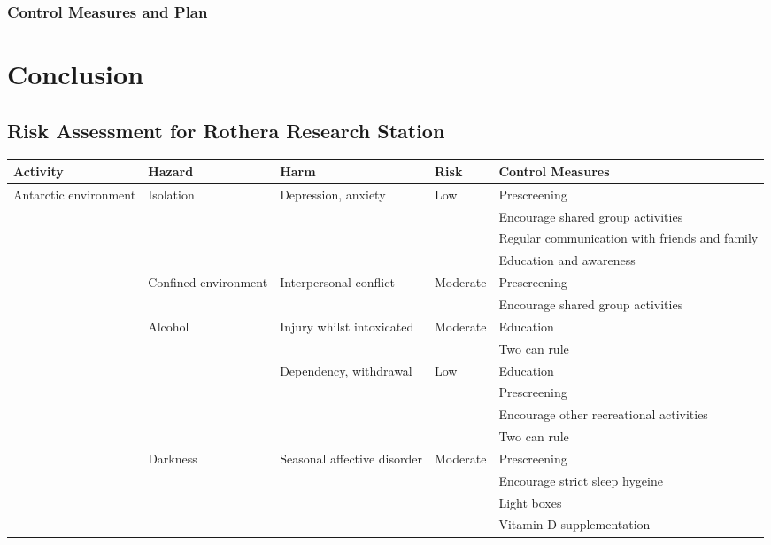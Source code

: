 \documentclass[12pt,a4paper]{article}
\begin{document}
\subsubsection{Control Measures and Plan}

\section{Conclusion}

\appendix
\begin{landscape}
    \section{Risk Assessment for Rothera Research Station}
    \begin{longtabu} to\linewidth{X[l]X[l]X[l]X[l]X[2,l]}
        \toprule
        \rowfont\bfseries Activity & Hazard & Harm & Risk & Control Measures \\
        \midrule
        \endhead
        Antarctic environment & Isolation & Depression, anxiety & Low & Prescreening \\
         &  &  &  & Encourage shared group activities \\
         &  &  &  & Regular communication with friends and family \\
         &  &  &  & Education and awareness \\
         & Confined environment & Interpersonal conflict & Moderate & Prescreening \\
         &  &  &  & Encourage shared group activities \\
         & Alcohol & Injury whilst intoxicated & Moderate & Education \\
         &  &  &  & Two can rule \\
         &  & Dependency, withdrawal & Low & Education \\
         &  &  &  & Prescreening \\
         &  &  &  & Encourage other recreational activities \\
         &  &  &  & Two can rule \\
         & Darkness & Seasonal affective disorder & Moderate & Prescreening \\
         &  &  &  & Encourage strict sleep hygeine \\
         &  &  &  & Light boxes \\
         &  &  &  & Vitamin D supplementation \\

\end{longtabu}
\end{landscape}
\end{document}
